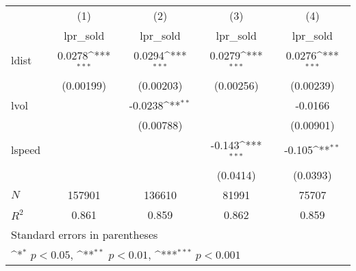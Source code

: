 {
\def\sym#1{\ifmmode^{#1}\else\(^{#1}\)\fi}
\begin{tabular}{l*{4}{c}}
\hline\hline
            &\multicolumn{1}{c}{(1)}&\multicolumn{1}{c}{(2)}&\multicolumn{1}{c}{(3)}&\multicolumn{1}{c}{(4)}\\
            &\multicolumn{1}{c}{lpr\_sold}&\multicolumn{1}{c}{lpr\_sold}&\multicolumn{1}{c}{lpr\_sold}&\multicolumn{1}{c}{lpr\_sold}\\
\hline
ldist       &      0.0278\sym{***}&      0.0294\sym{***}&      0.0279\sym{***}&      0.0276\sym{***}\\
            &   (0.00199)         &   (0.00203)         &   (0.00256)         &   (0.00239)         \\
[1em]
lvol        &                     &     -0.0238\sym{**} &                     &     -0.0166         \\
            &                     &   (0.00788)         &                     &   (0.00901)         \\
[1em]
lspeed      &                     &                     &      -0.143\sym{***}&      -0.105\sym{**} \\
            &                     &                     &    (0.0414)         &    (0.0393)         \\ [0.2em]
\hline
\(N\)       &      157901         &      136610         &       81991         &       75707         \\
\(R^{2}\)   &       0.861         &       0.859         &       0.862         &       0.859         \\
\hline\hline
\multicolumn{5}{l}{\footnotesize Standard errors in parentheses}\\
\multicolumn{5}{l}{\footnotesize \sym{*} \(p<0.05\), \sym{**} \(p<0.01\), \sym{***} \(p<0.001\)}\\
\end{tabular}
}

